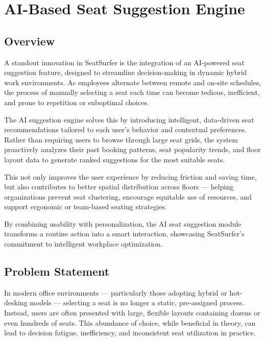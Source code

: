 \documentclass[12pt,a4paper]{report} %
\begin{document}
\newpage

\chapter{AI-Based Seat Suggestion Engine}

\section{Overview}

A standout innovation in SeatSurfer is the integration of an AI-powered seat suggestion feature, designed to streamline decision-making in dynamic hybrid work environments. As employees alternate between remote and on-site schedules, the process of manually selecting a seat each time can become tedious, inefficient, and prone to repetition or suboptimal choices.

The AI suggestion engine solves this by introducing intelligent, data-driven seat recommendations tailored to each user's behavior and contextual preferences. Rather than requiring users to browse through large seat grids, the system proactively analyzes their past booking patterns, seat popularity trends, and floor layout data to generate ranked suggestions for the most suitable seats.

This not only improves the user experience by reducing friction and saving time, but also contributes to better spatial distribution across floors — helping organizations prevent seat clustering, encourage equitable use of resources, and support ergonomic or team-based seating strategies.

By combining usability with personalization, the AI seat suggestion module transforms a routine action into a smart interaction, showcasing SeatSurfer's commitment to intelligent workplace optimization.

\section{Problem Statement}

In modern office environments — particularly those adopting hybrid or hot-desking models — selecting a seat is no longer a static, pre-assigned process. Instead, users are often presented with large, flexible layouts containing dozens or even hundreds of seats. This abundance of choice, while beneficial in theory, can lead to decision fatigue, inefficiency, and inconsistent seat utilization in practice.
\end{document}
